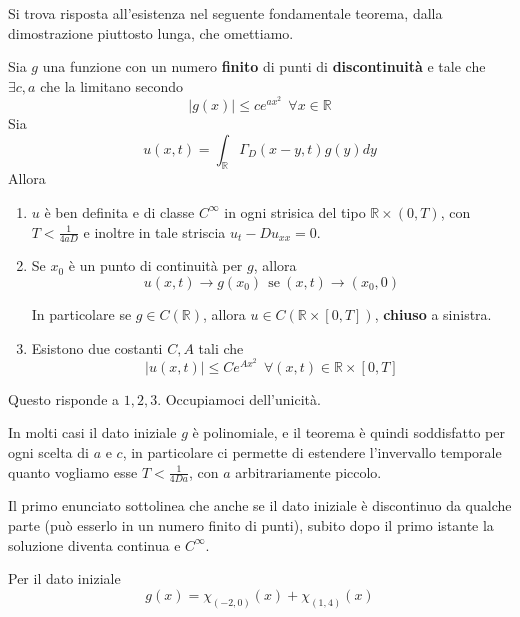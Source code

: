 \documentclass[10pt,a4paper,twoside,openright]{book}
\begin{document}
Si trova risposta all'esistenza nel seguente fondamentale teorema, dalla dimostrazione piuttosto lunga, che omettiamo.
\begin{theorem}
[di Esistenza] Sia $g$ una funzione con un numero \textbf{finito} di punti di \textbf{discontinuità} e tale che $\exists c,a$ che la limitano secondo
\begin{equation}
| g(x)| \leqslant ce^{ax^{2}} \ \ \forall x\in \mathbb{R} \tag{G}
\end{equation}
Sia
\begin{equation*}
u(x,t) =\int _{\mathbb{R}} \Gamma _{D}(x-y,t) g(y) dy
\end{equation*}
Allora
\begin{enumerate}
\item $u$ è ben definita e di classe $C^{\infty }$ in ogni strisica del tipo $\mathbb{R} \times (0,T)$, con $T< \frac{1}{4aD}$ e inoltre in tale striscia $u_{t} -Du_{xx} =0$.
\item Se $x_{0}$ è un punto di continuità per $g$, allora\begin{equation*}
u(x,t)\rightarrow g(x_{0}) \ \ \text{se} \ (x,t)\rightarrow (x_{0},0)
\end{equation*}

In particolare se $g\in C(\mathbb{R})$, allora $u\in C(\mathbb{R} \times [ 0,T])$, \textbf{chiuso} a sinistra.
\item Esistono due costanti $C,A$ tali che\begin{equation*}
| u(x,t)| \leqslant Ce^{Ax^{2}} \ \ \forall (x,t) \in \mathbb{R} \times [ 0,T]
\end{equation*}
\end{enumerate}
\end{theorem}

Questo risponde a $1,2,3$. Occupiamoci dell'unicità.
\begin{oss}
In molti casi il dato iniziale $g$ è polinomiale, e il teorema è quindi soddisfatto per ogni scelta di $a$ e $c$, in particolare ci permette di estendere l'invervallo temporale quanto vogliamo esse $T< \frac{1}{4Da}$, con $a$ arbitrariamente piccolo.
\end{oss}
\begin{oss}
 Il primo enunciato sottolinea che anche se il dato iniziale è discontinuo da qualche parte (può esserlo in un numero finito di punti), subito dopo il primo istante la soluzione diventa continua e $C^{\infty }$.
\end{oss}
Per il dato iniziale
\begin{equation*}
g(x) =\chi _{(-2,0)}(x) +\chi _{(1,4)}(x)
\end{equation*}
\end{document}
